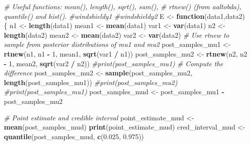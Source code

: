 \documentclass[
]{article}
\newenvironment{Shaded}{\begin{snugshade}}{\end{snugshade}}
\newcommand{\CommentTok}[1]{\textcolor[rgb]{0.56,0.35,0.01}{\textit{#1}}}
\newcommand{\ControlFlowTok}[1]{\textcolor[rgb]{0.13,0.29,0.53}{\textbf{#1}}}
\newcommand{\DecValTok}[1]{\textcolor[rgb]{0.00,0.00,0.81}{#1}}
\newcommand{\FloatTok}[1]{\textcolor[rgb]{0.00,0.00,0.81}{#1}}
\newcommand{\FunctionTok}[1]{\textcolor[rgb]{0.13,0.29,0.53}{\textbf{#1}}}
\newcommand{\NormalTok}[1]{#1}
\newcommand{\OtherTok}[1]{\textcolor[rgb]{0.56,0.35,0.01}{#1}}
\newcommand{\SpecialCharTok}[1]{\textcolor[rgb]{0.81,0.36,0.00}{\textbf{#1}}}
\begin{document}
\begin{Shaded}
\begin{Highlighting}[]
\CommentTok{\# Useful functions: mean(), length(), sqrt(), sum(),}
\CommentTok{\# rtnew() (from aaltobda), quantile() and hist().}
\CommentTok{\#windshieldy1}
\CommentTok{\#windshieldy2}
\NormalTok{E }\OtherTok{\textless{}{-}} \ControlFlowTok{function}\NormalTok{(data1,data2) \{}
\NormalTok{     n1 }\OtherTok{\textless{}{-}} \FunctionTok{length}\NormalTok{(data1)}
\NormalTok{     mean1 }\OtherTok{\textless{}{-}} \FunctionTok{mean}\NormalTok{(data1)}
\NormalTok{     var1 }\OtherTok{\textless{}{-}} \FunctionTok{var}\NormalTok{(data1)}
\NormalTok{     n2 }\OtherTok{\textless{}{-}} \FunctionTok{length}\NormalTok{(data2)}
\NormalTok{     mean2 }\OtherTok{\textless{}{-}} \FunctionTok{mean}\NormalTok{(data2)}
\NormalTok{     var2 }\OtherTok{\textless{}{-}} \FunctionTok{var}\NormalTok{(data2)}
     \CommentTok{\# Use rtnew to sample from posterior distributions of mu1 and mu2}
\NormalTok{     post\_samples\_mu1 }\OtherTok{\textless{}{-}} \FunctionTok{rtnew}\NormalTok{(n1, n1 }\SpecialCharTok{{-}} \DecValTok{1}\NormalTok{, mean1, }\FunctionTok{sqrt}\NormalTok{(var1 }\SpecialCharTok{/}\NormalTok{ n1))}
\NormalTok{     post\_samples\_mu2 }\OtherTok{\textless{}{-}} \FunctionTok{rtnew}\NormalTok{(n2, n2 }\SpecialCharTok{{-}} \DecValTok{1}\NormalTok{, mean2, }\FunctionTok{sqrt}\NormalTok{(var2 }\SpecialCharTok{/}\NormalTok{ n2))}
     \CommentTok{\#print(post\_samples\_mu1)}
     \CommentTok{\# Compute the difference}
\NormalTok{     post\_samples\_mu2 }\OtherTok{\textless{}{-}} \FunctionTok{sample}\NormalTok{(post\_samples\_mu2, }\FunctionTok{length}\NormalTok{(post\_samples\_mu1))}
     \CommentTok{\#print(post\_samples\_mu2)}
     \CommentTok{\#print(post\_samples\_mu1)}
\NormalTok{     post\_samples\_mud }\OtherTok{\textless{}{-}}\NormalTok{ post\_samples\_mu1 }\SpecialCharTok{{-}}\NormalTok{ post\_samples\_mu2}

     \CommentTok{\# Point estimate and credible interval}
\NormalTok{     point\_estimate\_mud }\OtherTok{\textless{}{-}} \FunctionTok{mean}\NormalTok{(post\_samples\_mud)}
     \FunctionTok{print}\NormalTok{(point\_estimate\_mud)}
\NormalTok{     cred\_interval\_mud }\OtherTok{\textless{}{-}} \FunctionTok{quantile}\NormalTok{(post\_samples\_mud, }\FunctionTok{c}\NormalTok{(}\FloatTok{0.025}\NormalTok{, }\FloatTok{0.975}\NormalTok{))}


\end{Highlighting}
\end{Shaded}
\end{document}
